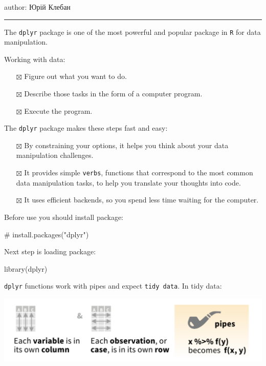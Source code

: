 \documentclass[
  letterpaper,
  DIV=11,
  numbers=noendperiod]{scrreprt}
\newenvironment{Shaded}{\begin{snugshade}}{\end{snugshade}}
\newcommand{\CommentTok}[1]{\textcolor[rgb]{0.37,0.37,0.37}{#1}}
\newcommand{\FunctionTok}[1]{\textcolor[rgb]{0.28,0.35,0.67}{#1}}
\newcommand{\NormalTok}[1]{\textcolor[rgb]{0.00,0.23,0.31}{#1}}
\providecommand{\tightlist}{%
  \setlength{\itemsep}{0pt}\setlength{\parskip}{0pt}}\usepackage{longtable,booktabs,array}
\begin{document}
author: Юрій Клебан

\begin{center}\rule{0.5\linewidth}{0.5pt}\end{center}

The \texttt{dplyr} package is one of the most powerful and popular
package in \texttt{R} for data manipulation.

Working with data:

\begin{itemize}
\tightlist
\item[$\boxtimes$]
  Figure out what you want to do.
\item[$\boxtimes$]
  Describe those tasks in the form of a computer program.
\item[$\boxtimes$]
  Execute the program.
\end{itemize}

The \texttt{dplyr} package makes these steps fast and easy:

\begin{itemize}
\tightlist
\item[$\boxtimes$]
  By constraining your options, it helps you think about your data
  manipulation challenges.
\item[$\boxtimes$]
  It provides simple \texttt{verbs}, functions that correspond to the
  most common data manipulation tasks, to help you translate your
  thoughts into code.
\item[$\boxtimes$]
  It uses efficient backends, so you spend less time waiting for the
  computer.
\end{itemize}

Before use you should install package:

\begin{Shaded}
\begin{Highlighting}[]
\CommentTok{\# install.packages("dplyr")}
\end{Highlighting}
\end{Shaded}

Next step is loading package:

\begin{Shaded}
\begin{Highlighting}[]
\FunctionTok{library}\NormalTok{(dplyr)}
\end{Highlighting}
\end{Shaded}

\texttt{dplyr} functions work with pipes and expect \texttt{tidy\ data}.
In tidy data:

\includegraphics{img/da-dplyr/dplyr1.png}
\end{document}
